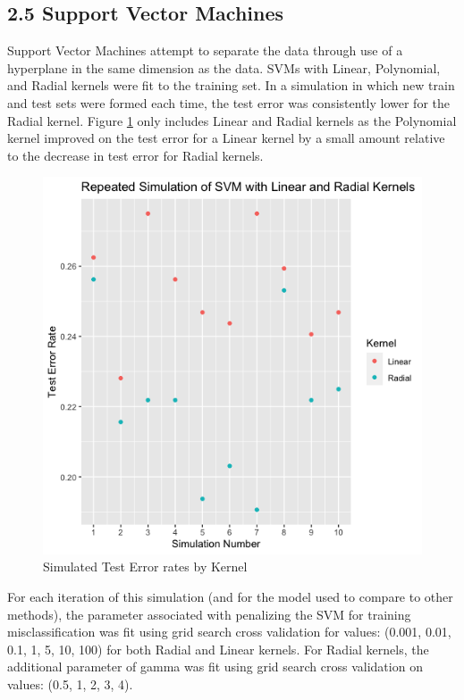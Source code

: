 \documentclass{article}
\begin{document}
\subsection{2.5  Support Vector Machines}
Support Vector Machines attempt to separate the data through use of a hyperplane in the same dimension as the data. SVMs with Linear, Polynomial, and Radial kernels were fit to the training set. In a simulation in which new train and test sets were formed each time, the test error was consistently lower for the Radial kernel. Figure \ref{SVM Test Error Simulation} only includes Linear and Radial kernels as the Polynomial kernel improved on the test error for a  Linear kernel by a small amount relative to the decrease in test error for Radial kernels.
\begin{figure}[H]
    \centering
    \includegraphics[scale=0.6]{Error_Sim_Plot.png}
    \caption{Simulated Test Error rates by Kernel}
    \label{SVM Test Error Simulation}
\end{figure}
For each iteration of this simulation (and for the model used to compare to other methods), the parameter associated with penalizing the SVM for training misclassification was fit using grid search cross validation for values: (0.001, 0.01, 0.1, 1, 5, 10, 100) for both Radial and Linear kernels. For Radial kernels, the additional parameter of gamma was fit using grid search cross validation on values: (0.5, 1, 2, 3, 4). 
\end{document}
